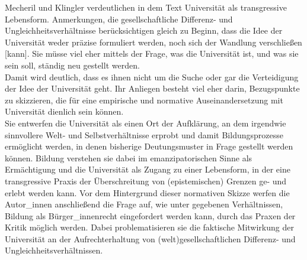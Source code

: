 Mecheril und Klingler verdeutlichen in dem Text \glqq Universität als
transgressive Lebensform. Anmerkungen, die gesellschaftliche Differenz- und
Ungleichheitsverhältnisse berücksichtigen\grqq\footnotemark
{} gleich zu Beginn, dass \glqq die Idee
der Universität weder präzise formuliert werden, noch sich der Wandlung
verschließen [kann].\grqq\footnotemark {} Sie müsse viel eher mittels der Frage, was die
Universität ist, und was sie sein soll, ständig neu gestellt werden.\\
Damit wird deutlich, dass es ihnen nicht um die Suche oder gar die Verteidigung der
Idee der Universität geht. Ihr Anliegen besteht viel eher darin, Bezugspunkte
zu skizzieren, die für eine empirische und normative Auseinandersetzung mit
Universität dienlich sein können.\\
Sie entwerfen die Universität als
einen Ort der Aufklärung, an dem \glqq irgendwie sinnvollere Welt- und
Selbstverhältnisse\grqq\footnotemark {} erprobt und damit Bildungsprozesse ermöglicht werden, in denen bisherige Deutungsmuster in Frage gestellt werden können. Bildung
verstehen sie dabei im emanzipatorischen Sinne als Ermächtigung und die
Universität als Zugang zu einer Lebensform, in der eine transgressive Praxis
der Überschreitung von (epistemischen) Grenzen ge- und erlebt werden kann. Vor
dem Hintergrund dieser normativen Skizze werfen die Autor\_innen anschließend
die Frage auf, wie unter gegebenen Verhältnissen, Bildung als Bürger\_innenrecht
eingefordert werden kann, durch das Praxen der Kritik möglich werden. Dabei
problematisieren sie die faktische Mitwirkung der Universität an der
Aufrechterhaltung von (welt)gesellschaftlichen Differenz- und
Ungleichheitsverhältnissen.\\

